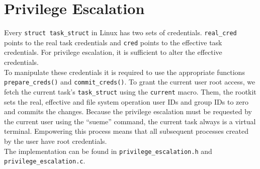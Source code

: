 \section{Privilege Escalation}
Every \texttt{struct task\_struct} in Linux has two sets of credentials. 
\texttt{real\_cred} points to the real task credentials and \texttt{cred} points 
to the effective task credentials. For privilege escalation, it is sufficient to 
alter the effective credentials.\\
To manipulate these credentials it is required to use the appropriate functions 
\texttt{prepare\_creds()} and \texttt{commit\_creds()}.
To grant the current user root access, we fetch the current task's 
\texttt{task\_struct} using the \texttt{current} macro. Them, the rootkit sets 
the real, effective and file system operation user IDs and group IDs to zero 
and commits the changes. Because the privilege escalation must be requested by 
the current user using the ``sueme'' command, the current task always is a 
virtual terminal. Empowering this process means that all subsequent processes 
created by the user have root credentials.\\
The implementation can be found in \verb+privilege_escalation.h+ and \verb+privilege_escalation.c+.
					
